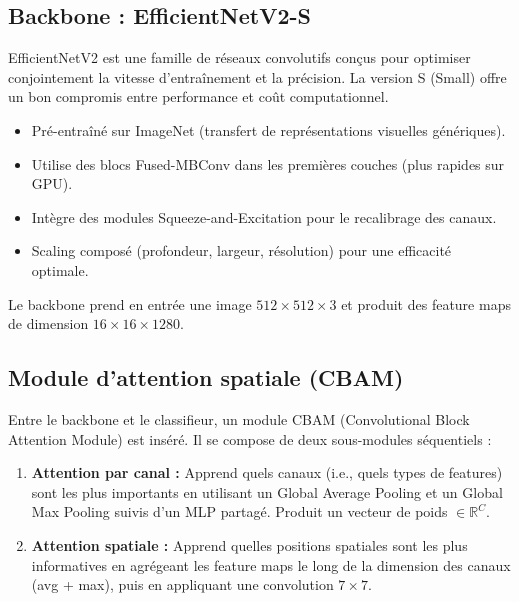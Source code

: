 \documentclass[11pt,a4paper]{article}
\begin{document}
\subsection{Backbone : EfficientNetV2-S}

EfficientNetV2 est une famille de réseaux convolutifs conçus pour optimiser conjointement la vitesse d'entraînement et la précision. La version S (Small) offre un bon compromis entre performance et coût computationnel.

\begin{infobox}
\begin{itemize}[leftmargin=1.5em]
  \item Pré-entraîné sur ImageNet (transfert de représentations visuelles génériques).
  \item Utilise des blocs Fused-MBConv dans les premières couches (plus rapides sur GPU).
  \item Intègre des modules Squeeze-and-Excitation pour le recalibrage des canaux.
  \item Scaling composé (profondeur, largeur, résolution) pour une efficacité optimale.
\end{itemize}
\end{infobox}

Le backbone prend en entrée une image $512 \times 512 \times 3$ et produit des feature maps de dimension $16 \times 16 \times 1280$.

\subsection{Module d'attention spatiale (CBAM)}

Entre le backbone et le classifieur, un module CBAM (Convolutional Block Attention Module) est inséré. Il se compose de deux sous-modules séquentiels :

\begin{enumerate}[leftmargin=2em]
  \item \textbf{Attention par canal :} Apprend quels canaux (i.e., quels types de features) sont les plus importants en utilisant un Global Average Pooling et un Global Max Pooling suivis d'un MLP partagé. Produit un vecteur de poids $\in \mathbb{R}^C$.

  \item \textbf{Attention spatiale :} Apprend quelles positions spatiales sont les plus informatives en agrégeant les feature maps le long de la dimension des canaux (avg + max), puis en appliquant une convolution $7 \times 7$.
\end{enumerate}
\end{document}

